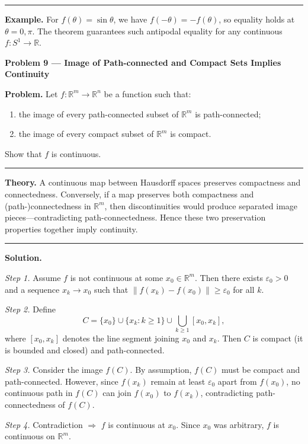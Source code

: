 \documentclass[12pt,a4paper]{article}
\theoremstyle{plain}
\theoremstyle{definition}
\theoremstyle{remark}
\theoremstyle{remark}
\newcommand{\probheader}[1]{%
	\par\vspace{8pt}%
	{\Large\bfseries #1\par}%
	\vspace{6pt}%
}
\newcommand{\sep}{\vspace{6pt}\hrule\vspace{8pt}}
\begin{document}
	\sep
	
	\textbf{Example.}
	For $f(\theta)=\sin\theta$, we have $f(-\theta)=-f(\theta)$,
	so equality holds at $\theta=0,\pi$.
	The theorem guarantees such antipodal equality for any continuous $f:S^1\to\mathbb{R}$.
	
	\probheader{Problem 9 — Image of Path-connected and Compact Sets Implies Continuity}
	
	\textbf{Problem.}
	Let $f:\mathbb{R}^m\to\mathbb{R}^n$ be a function such that:
	\begin{enumerate}[label=(\arabic*), leftmargin=1.2cm]
		\item the image of every path-connected subset of $\mathbb{R}^m$ is path-connected;
		\item the image of every compact subset of $\mathbb{R}^m$ is compact.
	\end{enumerate}
	Show that $f$ is continuous.
	
	\sep
	
	\textbf{Theory.}
	A continuous map between Hausdorff spaces preserves compactness and connectedness.
	Conversely, if a map preserves both compactness and (path-)connectedness in $\mathbb{R}^m$,
	then discontinuities would produce separated image pieces—contradicting path-connectedness.
	Hence these two preservation properties together imply continuity.
	
	\sep
	
	\textbf{Solution.}
	
	\textit{Step 1.} Assume $f$ is not continuous at some $x_0\in\mathbb{R}^m$.
	Then there exists $\varepsilon_0>0$ and a sequence $x_k\to x_0$
	such that $\|f(x_k)-f(x_0)\|\ge\varepsilon_0$ for all $k$.
	
	\medskip
	
	\textit{Step 2.} Define
	\[
	C=\{x_0\}\cup\{x_k:k\ge1\}\cup
	\bigcup_{k\ge1}[x_0,x_k],
	\]
	where $[x_0,x_k]$ denotes the line segment joining $x_0$ and $x_k$.
	Then $C$ is compact (it is bounded and closed) and path-connected.
	
	\medskip
	
	\textit{Step 3.} Consider the image $f(C)$.
	By assumption, $f(C)$ must be compact and path-connected.
	However, since $f(x_k)$ remain at least $\varepsilon_0$ apart from $f(x_0)$,
	no continuous path in $f(C)$ can join $f(x_0)$ to $f(x_k)$,
	contradicting path-connectedness of $f(C)$.
	
	\medskip
	
	\textit{Step 4.} Contradiction $\Rightarrow$ $f$ is continuous at $x_0$.
	Since $x_0$ was arbitrary, $f$ is continuous on $\mathbb{R}^m$.
	
\end{document}
